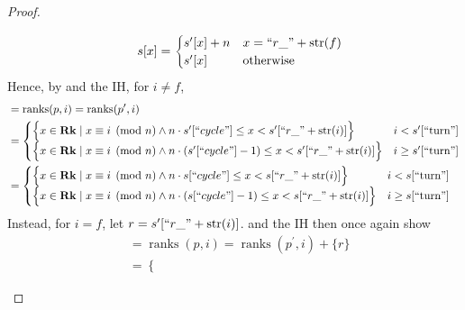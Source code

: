 \documentclass{amsart}
\DeclareMathOperator{\Rk}{\mathbf{Rk}}
\DeclareMathOperator{\ranks}{\mathrm{ranks}}
\theoremstyle{definition}
\begin{document}
\begin{proof}
\begin{enumerate}
\begin{enumerate}
\begin{align*}
                        &&
                        s[x] =
                        \begin{cases}
                            s^\prime[x] + n & x = ``r\_" + \mathrm{str}(f)\\
                            s^\prime[x] & \text{otherwise}
                        \end{cases}
                    \end{align*}
                    Hence, by  and the IH, for $i \neq f$,
                    \begin{align*}
                        &= \ranks(p, i) = \ranks(p^\prime, i)\\
                        &=
                            \begin{cases}
                                \Big\{x \in \Rk \mid x \equiv i \pmod n \land n \cdot s^\prime[``cycle"] \leq x < s^\prime[``r\_" + \mathrm{str}(i)] \Big\} 
                                & i < s^\prime[``\text{turn}"]\\
                                \Big\{x \in \Rk \mid x \equiv i \pmod n \land n \cdot (s^\prime[``cycle"] - 1) \leq x < s^\prime[``r\_" + \mathrm{str}(i)]\Big\} 
                                & i \geq s^\prime[``\text{turn}"]
                            \end{cases}\\
                        &=
                            \begin{cases}
                                \Big\{x \in \Rk \mid x \equiv i \pmod n \land n \cdot s[``cycle"] \leq x < s[``r\_" + \mathrm{str}(i)] \Big\} 
                                & i < s[``\text{turn}"]\\
                                \Big\{x \in \Rk \mid x \equiv i \pmod n \land n \cdot (s[``cycle"] - 1) \leq x < s[``r\_" + \mathrm{str}(i)]\Big\} 
                                & i \geq s[``\text{turn}"]
                            \end{cases}
                    \end{align*}
                    Instead, for $i = f$, let $r = s^\prime[``r\_" + \mathrm{str}(i)]$. 
                     and the IH then once again show
                    \begin{align*}
                        &= \ranks(p, i) = \ranks(p^\prime, i) + \{r\}\\
                        &=
                            \begin{cases}

\end{cases}
\end{align*}
\end{enumerate}
\end{enumerate}
\end{proof}
\end{document}
